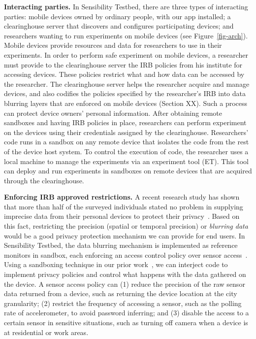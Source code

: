 \textbf{Interacting parties.}
In Sensibility Testbed, there are three types of interacting
parties: mobile devices owned by ordinary people, with our app
installed; a clearinghouse server that discovers and configures
participating devices; and researchers wanting to run
experiments on mobile devices (see Figure~\ref{fig-arch}). Mobile devices
provide resources and data for researchers to use in their
experiments. In order to perform safe experiment on mobile
devices, a researcher must provide to the clearinghouse server
the IRB policies from his institute for accessing devices. These 
policies restrict what and how data can be accessed by the 
researcher. The
clearinghouse server helps the researcher acquire and manage
devices, and also codifies the policies specified by the
researcher's IRB into data blurring layers that are enforced on
mobile devices (Section XX). Such a process can protect device
owners' personal information. After obtaining remote sandboxes
and having IRB policies in place, researchers can perform
experiment on the devices using their credentials assigned by
the clearinghouse. Researchers' code runs in a sandbox on any
remote device that isolates the code from the rest of the device
host system. To control the execution of code, the researcher
uses a local machine to manage the experiments via an experiment
tool (ET). This tool can deploy and run experiments in sandboxes
on remote devices that are acquired through the clearinghouse.

\textbf{Enforcing IRB approved restrictions.}
A recent research study has shown that more than half of the 
surveyed individuals stated no problem in supplying imprecise 
data from their personal devices to protect their 
privacy~\cite{fawaz2014location}. Based on this fact, restricting 
the precision (spatial or temporal precision) or \textit{blurring 
data} would be a good privacy protection mechanism we can 
provide for end users. In Sensibility Testbed, the data blurring 
mechanism is implemented as reference monitors in sandbox, 
each enforcing an access control 
policy over sensor access~\cite{ref}. Using a sandboxing 
technique in our prior work~\cite{cappos2010retaining}, we can 
interject code to implement privacy policies and control what 
happens with the data gathered on the device. A sensor access 
policy can (1) reduce 
the precision of the raw sensor data returned from a device, such
as returning the device location at the city granularity; (2) restrict 
the frequency of accessing a sensor, such as the polling rate of 
accelerometer, to avoid password inferring; and (3) disable the 
access to a certain sensor in sensitive situations, such as 
turning off camera when a device is at residential or work areas.

